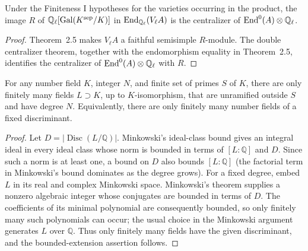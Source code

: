 \begin{corollary}
\label{cor:milne-tate-double-centralizer}

Under the Finiteness I hypotheses for the varieties occurring in the product,
the image $R$ of $\mathbb{Q}_\ell[\operatorname{Gal}(K^{\mathrm{sep}}/K)]$ in
$\operatorname{End}_{\mathbb{Q}_\ell}(V_\ell A)$ is the centralizer of
$\operatorname{End}^0(A)\otimes\mathbb{Q}_\ell$.
\end{corollary}

\begin{proof}

Theorem~2.5 makes $V_\ell A$ a faithful semisimple $R$-module.  The double
centralizer theorem, together with the endomorphism equality in Theorem~2.5,
identifies the centralizer of $\operatorname{End}^0(A)\otimes\mathbb{Q}_\ell$ with $R$.

\end{proof}


\begin{theorem}
\label{thm:milne-hermite-finiteness}

For any number field $K$, integer $N$, and finite set of primes $S$ of $K$,
there are only finitely many fields $L\supset K$, up to $K$-isomorphism, that
are unramified outside $S$ and have degree $N$.  Equivalently, there are only
finitely many number fields of a fixed discriminant.
\end{theorem}

\begin{proof}

Let $D=|\operatorname{Disc}(L/\mathbb Q)|$.  Minkowski's ideal-class bound
gives an integral ideal in every ideal class whose norm is bounded in terms of
$[L:\mathbb Q]$ and $D$.  Since such a norm is at least one, a bound on $D$
also bounds $[L:\mathbb Q]$ (the factorial term in Minkowski's bound dominates
as the degree grows).  For a fixed degree, embed $L$ in its real and complex
Minkowski space.  Minkowski's theorem supplies a nonzero algebraic integer
whose conjugates are bounded in terms of $D$.  The coefficients of its minimal
polynomial are consequently bounded, so only finitely many such polynomials
can occur; the usual choice in the Minkowski argument generates $L$ over
$\mathbb Q$.  Thus only finitely many fields have the given discriminant, and
the bounded-extension assertion follows.

\end{proof}


